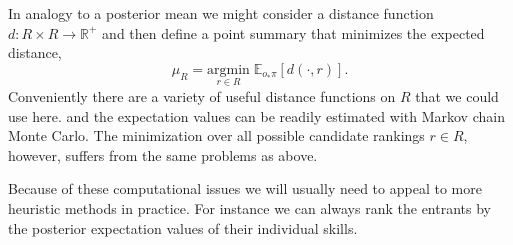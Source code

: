 \documentclass[
  letterpaper,
  DIV=11,
  numbers=noendperiod]{scrartcl}
\newenvironment{Shaded}{\begin{snugshade}}{\end{snugshade}}
\newcommand{\AttributeTok}[1]{\textcolor[rgb]{0.40,0.45,0.13}{#1}}
\newcommand{\ConstantTok}[1]{\textcolor[rgb]{0.56,0.35,0.01}{#1}}
\newcommand{\ControlFlowTok}[1]{\textcolor[rgb]{0.00,0.23,0.31}{#1}}
\newcommand{\DecValTok}[1]{\textcolor[rgb]{0.68,0.00,0.00}{#1}}
\newcommand{\FunctionTok}[1]{\textcolor[rgb]{0.28,0.35,0.67}{#1}}
\newcommand{\NormalTok}[1]{\textcolor[rgb]{0.00,0.23,0.31}{#1}}
\newcommand{\OtherTok}[1]{\textcolor[rgb]{0.00,0.23,0.31}{#1}}
\newcommand{\SpecialCharTok}[1]{\textcolor[rgb]{0.37,0.37,0.37}{#1}}
\newcommand{\StringTok}[1]{\textcolor[rgb]{0.13,0.47,0.30}{#1}}
\begin{document}
In analogy to a posterior mean we might consider a distance function
\(d : R \times R \rightarrow \mathbb{R}^{+}\) and then define a point
summary that minimizes the expected distance, \[
\mu_{R}
=
\underset{r \in R}{\mathrm{argmin}} \; \mathbb{E}_{o_{*} \pi}[ d( \cdot, r) ].
\] Conveniently there are a variety of useful distance functions on
\(R\) that we could use here. and the expectation values can be readily
estimated with Markov chain Monte Carlo. The minimization over all
possible candidate rankings \(r \in R\), however, suffers from the same
problems as above.

Because of these computational issues we will usually need to appeal to
more heuristic methods in practice. For instance we can always rank the
entrants by the posterior expectation values of their individual skills.

\begin{Shaded}
\end{Shaded}
\end{document}
